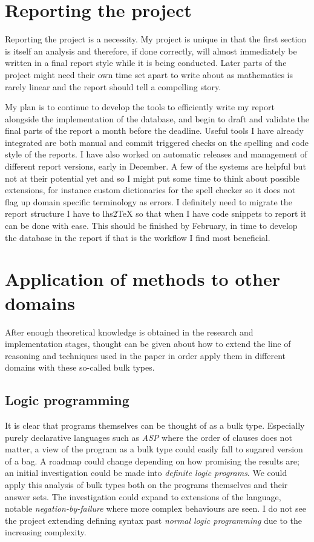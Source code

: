 \section{Reporting the project}
Reporting the project is a necessity. My project is unique in that the first section is itself an analysis and therefore, if done correctly, will almost immediately be written in a final report style while it is being conducted. Later parts of the project might need their own time set apart to write about as mathematics is rarely linear and the report should tell a compelling story.

My plan is to continue to develop the tools to efficiently write my report alongside the implementation of the database, and begin to draft and validate the final parts of the report a month before the deadline. Useful tools I have already integrated are both manual and commit triggered checks on the spelling and code style of the reports. I have also worked on automatic releases and management of different report versions, early in December. A few of the systems are helpful but not at their potential yet and so I might put some time to think about possible extensions, for instance custom dictionaries for the spell checker so it does not flag up domain specific terminology as errors. I definitely need to migrate the report structure I have to lhs2\TeX{} so that when I have code snippets to report it can be done with ease. This should be finished by February, in time to develop the database in the report if that is the workflow I find most beneficial.

\section{Application of methods to other domains}
After enough theoretical knowledge is obtained in the research and implementation stages, thought can be given about how to extend the line of reasoning and techniques used in the paper in order apply them in different domains with these so-called bulk types.
\subsection{Logic programming}
It is clear that programs themselves can be thought of as a bulk type. Especially purely declarative languages such as \emph{ASP} where the order of clauses does not matter, a view of the program as a bulk type could easily fall to sugared version of a bag. A roadmap could change depending on how promising the results are; an initial investigation could be made into \emph{definite logic programs}. We could apply this analysis of bulk types both on the programs themselves and their answer sets. The investigation could expand to extensions of the language, notable \emph{negation-by-failure} where more complex behaviours are seen. I do not see the project extending defining syntax past \emph{normal logic programming} due to the increasing complexity.
